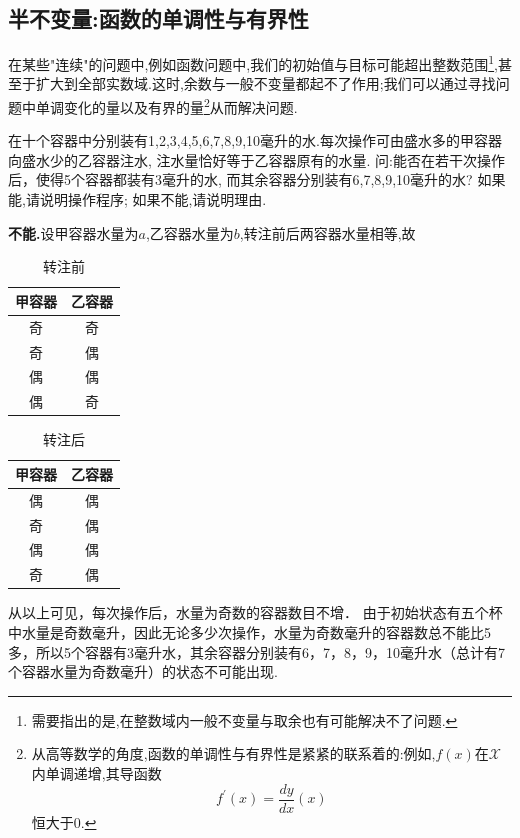 \subsection{半不变量:函数的单调性与有界性}
在某些"连续"的问题中,例如函数问题中,我们的初始值与目标可能超出整数范围\footnote{需要指出的是,在整数域内一般不变量与取余也有可能解决不了问题.},甚至于扩大到全部实数域.这时,余数与一般不变量都起不了作用;我们可以通过寻找问题中单调变化的量以及有界的量\footnote{从高等数学的角度,函数的单调性与有界性是紧紧的联系着的:例如,$f(x)$在$\mathcal{X}$内单调递增,其导函数$$f^{\prime}(x)=\dfrac{dy
}{dx}(x)$$恒大于0.}从而解决问题.

\begin{problem}
    在十个容器中分别装有1,2,3,4,5,6,7,8,9,10毫升的水.每次操作可由盛水多的甲容器向盛水少的乙容器注水,
     注水量恰好等于乙容器原有的水量. 问:能否在若干次操作后，使得5个容器都装有3毫升的水, 而其余容器分别装有6,7,8,9,10毫升的水? 如果能,请说明操作程序; 如果不能,请说明理由.
\end{problem}
\begin{solution}
    \textbf{不能.}设甲容器水量为$a$,乙容器水量为$b$,转注前后两容器水量相等,故
    
    \begin{table}[ht!]
        \caption{转注前}
        \begin{center}
            \begin{tabular}{cc}
        \hline
        甲容器 & 乙容器 \\ \hline
        奇   & 奇   \\
        奇   & 偶   \\
        偶   & 偶   \\
        偶   & 奇  \\
        \hline
        \end{tabular}
        \end{center}
        
    \end{table}
    \begin{table}[ht!]
        \caption{转注后}
        \begin{center}
            \begin{tabular}{cc}
        \hline
        甲容器 & 乙容器 \\ \hline
        偶   & 偶   \\
        奇   & 偶   \\
        偶   & 偶   \\
        奇   & 偶  \\
        \hline
        \end{tabular}
        \end{center}
        
    \end{table}
    从以上可见，每次操作后，水量为奇数的容器数目不增．
    由于初始状态有五个杯中水量是奇数毫升，因此无论多少次操作，水量为奇数毫升的容器数总不能比5多，所以5个容器有3毫升水，其余容器分别装有6，7，8，9，10毫升水（总计有7个容器水量为奇数毫升）的状态不可能出现.
    
\end{solution}
